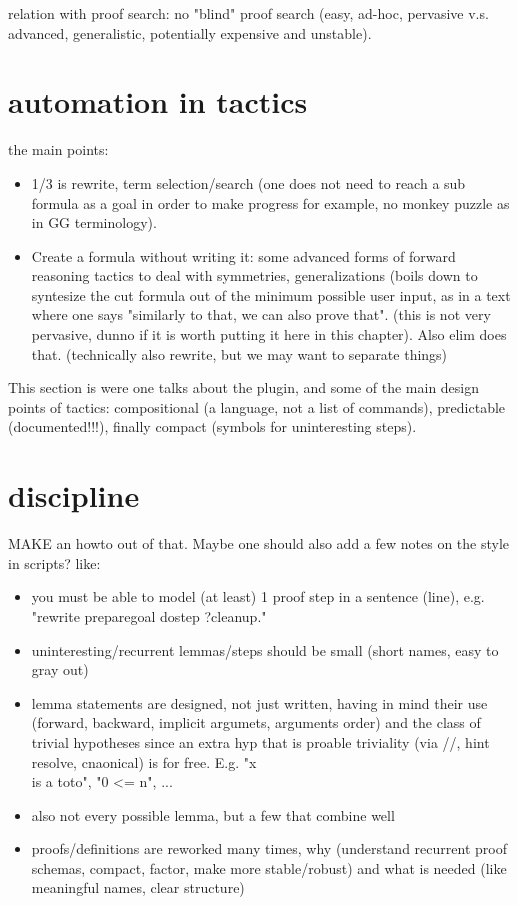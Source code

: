 relation with proof search: no "blind" proof search (easy, ad-hoc, pervasive
v.s. advanced, generalistic, potentially expensive and unstable).

\section{automation in tactics}
the main points:
\begin{itemize}
\item 1/3 is rewrite, term selection/search (one does not need to reach a sub
	formula as a goal in order to make progress for example, no monkey
	puzzle as in GG terminology).
\item Create a formula without writing it: some advanced forms of forward
	reasoning tactics to deal with symmetries, generalizations (boils down
	to syntesize the cut formula out of the minimum possible user input, as
	in a text where one says "similarly to that, we can also prove that".
	(this is not very pervasive, dunno if it is worth putting it here in
	this chapter).  Also elim does that. (technically also rewrite, but we
	may want to separate things)
\end{itemize}
This section is were one talks about the plugin, and some of the main design
points of tactics: compositional (a language, not a list of commands),
predictable (documented!!!), finally compact (symbols for uninteresting steps).

\section{discipline}
MAKE an howto out of that.
Maybe one should also add a few notes on the style in scripts? like:
\begin{itemize}
\item you must be able to model (at least) 1 proof step in a sentence (line),
  e.g. "rewrite preparegoal dostep ?cleanup."
\item uninteresting/recurrent lemmas/steps should be small (short names, easy to
  gray out)
\item lemma statements are designed, not just written, having in mind their use
      (forward, backward, implicit argumets, arguments order)
      and the class of trivial hypotheses since an extra hyp that is proable
      triviality (via //, hint resolve, cnaonical) is for free. E.g.
      "x \\is a toto", "0 <= n", ...
\item also not every possible lemma, but a few that combine well
\item proofs/definitions are reworked many times, why (understand recurrent
  proof schemas, compact, factor, make more stable/robust) and what is needed
  (like meaningful names, clear structure)
\end{itemize}

